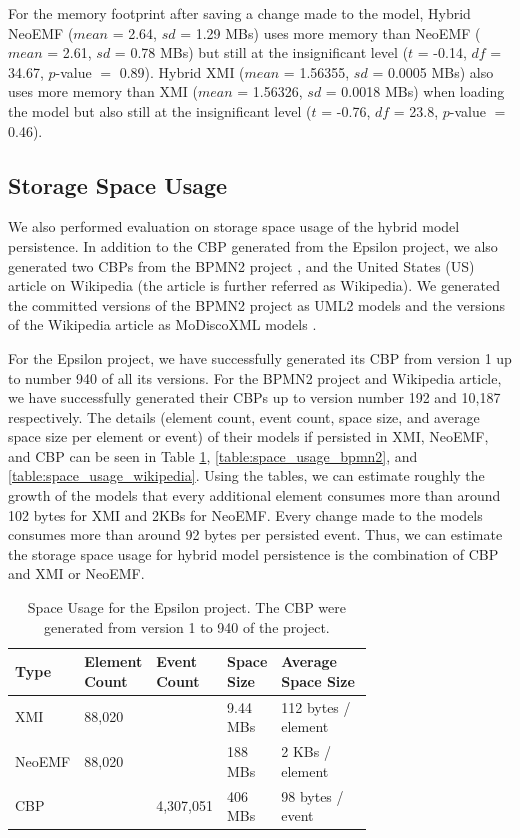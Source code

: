 \documentclass[10pt,conference]{IEEEtran}
\begin{document}
For the memory footprint after saving a change made to the model, Hybrid NeoEMF ($mean$ = 2.64, $sd$ = 1.29 MBs) uses more memory than NeoEMF ($mean$ = 2.61, $sd$ = 0.78 MBs) but still at the insignificant level ($t$ = -0.14, $df$ = 34.67, $p$-value $=$ 0.89). Hybrid XMI ($mean$ = 1.56355, $sd$ = 0.0005 MBs) also uses more memory than XMI ($mean$ = 1.56326, $sd$ = 0.0018 MBs) when loading the model but also still at the insignificant level ($t$ = -0.76, $df$ = 23.8, $p$-value $=$ 0.46).  

\subsection{Storage Space Usage}
\label{sec:storage_space_usage}
We also performed evaluation on storage space usage of the hybrid model persistence. In addition to the CBP generated from the Epsilon project, we also generated two CBPs from the BPMN2 project \cite{eclipse2017bpmn2,eclipse2018bpmn2git}, and the United States (US) article \cite{wikipedia2018us} on Wikipedia (the article is further referred as Wikipedia). We generated the committed versions of the BPMN2 project as UML2 models \cite{eclipse2017uml2} and the versions of the Wikipedia article as MoDiscoXML models \cite{eclipse2018modiscoxml}.

For the Epsilon project, we have successfully generated its CBP from version 1 up to number 940 of all its versions. For the BPMN2 project and Wikipedia article, we have successfully generated their CBPs up to version number 192 and 10,187 respectively. The details (element count, event count, space size, and average space size per element or event) of their models if persisted in XMI, NeoEMF, and CBP can be seen in Table \ref{table:space_usage_epsilon}, \ref{table:space_usage_bpmn2}, and \ref{table:space_usage_wikipedia}. Using the tables, we can estimate roughly the growth of the models that every additional element consumes more than around 102 bytes for XMI and 2KBs for NeoEMF. Every change made to the models consumes more than around 92 bytes per persisted event. Thus, we can estimate the storage space usage for hybrid model persistence is the combination of CBP and XMI or NeoEMF.

\begin{table} [ht]
    \centering
    \caption{Space Usage for the Epsilon project. The CBP were generated from  version 1 to 940 of the project.}
    \label{table:space_usage_epsilon}
    \begin{tabular}{ p{0.1\linewidth} p{0.1\linewidth} p{0.12\linewidth} p{0.13\linewidth} p{0.26\linewidth} }
    \hline 
    \textbf{Type} & \textbf{Element Count} & \textbf{Event Count} & \textbf{Space Size} & \textbf{Average Space Size} \\
    \hline 
    XMI & 88,020 &  & 9.44 MBs & 112 bytes / element  \\
    NeoEMF & 88,020 &  & 188 MBs & 2 KBs / element \\
    CBP &  & 4,307,051 & 406 MBs &  98 bytes / event \\
    \hline 
    \end{tabular}
\end{table}
\end{document}
